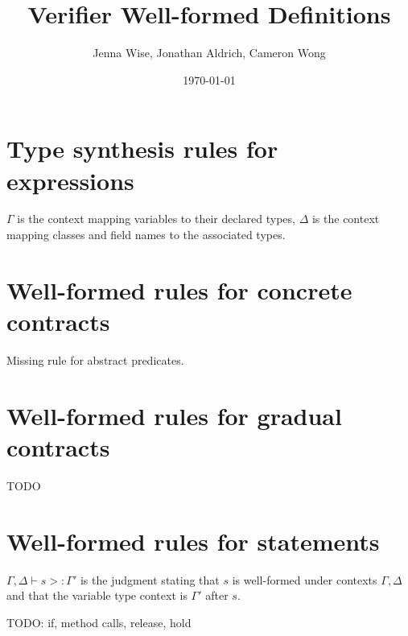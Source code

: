 \documentclass {article}
\title {Verifier Well-formed Definitions}
\author {Jenna Wise, Jonathan Aldrich, Cameron Wong}
\date {\today}
\newcommand{\acc}[1]{\text{acc}(#1)}
\newcommand{\intty}{int}
\newcommand{\tyctx}{\Gamma}
\newcommand{\clsctx}{\Delta}
\newcommand{\derives}[2]{#1 \vdash #2}
\newcommand{\tyderives}[3][\tyctx,\clsctx]{\derives{#1}{#2 : #3}}
\newcommand{\isok}[2][\tyctx,\clsctx]{\derives{#1}{#2 \ \textsc{ok}}}
\newcommand{\begets}[2]{#1 >: #2}
\newcommand{\stmwf}[3][\tyctx,\clsctx]{\derives{#1}{\begets{#2}{#3}}}
\begin{document}
\maketitle

\section{Type synthesis rules for expressions}

$\tyctx$ is the context mapping variables to their declared types, $\clsctx$ is
the context mapping classes and field names to the associated types.


\section{Well-formed rules for concrete contracts}

Missing rule for abstract predicates.


\section{Well-formed rules for gradual contracts}

TODO

\section{Well-formed rules for statements}

$\stmwf{s}{\tyctx'}$ is the judgment stating that $s$ is well-formed under
contexts $\tyctx,\clsctx$ and that the variable type context is $\tyctx'$ after
$s$.

TODO: if, method calls, release, hold

\end{document}
